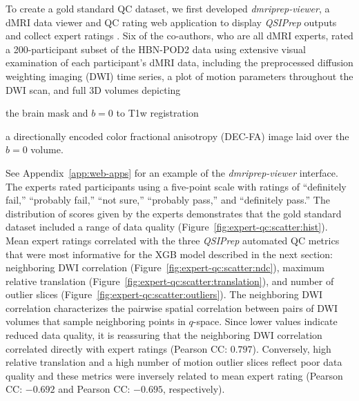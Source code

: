 \documentclass[9pt,lineno]{elife}
\begin{document}
To create a gold standard QC dataset, we first developed \emph{dmriprep-viewer},
a dMRI data viewer and QC rating web application to display \emph{QSIPrep}
outputs and collect expert ratings \citep{richie-halford2021-viewer}. Six of the
co-authors, who are all dMRI experts, rated a 200-participant subset of the
HBN-POD2 data using extensive visual examination of each participant's dMRI data,
including the preprocessed diffusion weighting imaging (DWI) time series, a plot of
motion parameters throughout the DWI scan, and full 3D volumes depicting
\begin{enumerate*}[%
    label=(\roman*),%
    before={{ }},%
    itemjoin={{, }},%
    itemjoin*={{ and }}]
    \item the brain mask and $b=0$ to T1w registration
    \item a directionally encoded color fractional anisotropy (DEC-FA) image laid over the $b=0$ volume.
\end{enumerate*}
See Appendix~\ref{app:web-apps} for an example of the \emph{dmriprep-viewer} interface. The experts rated participants using a five-point scale with ratings of ``definitely
fail,'' ``probably fail,'' ``not sure,'' ``probably pass,'' and ``definitely
pass.'' The distribution of scores given by the experts demonstrates that the
gold standard dataset included a range of data quality (Figure~\ref{fig:expert-qc:scatter:hist}). Mean expert ratings
correlated with the three \emph{QSIPrep} automated QC metrics that were most informative for the XGB model described in the next section:
neighboring DWI correlation \citep{yeh2019-kb} (Figure~\ref{fig:expert-qc:scatter:ndc}), maximum relative
translation (Figure~\ref{fig:expert-qc:scatter:translation}), and number of outlier slices (Figure~\ref{fig:expert-qc:scatter:outliers}). The neighboring DWI correlation characterizes
the pairwise spatial correlation between pairs of DWI volumes that sample
neighboring points in $q$-space. Since lower values indicate reduced data
quality, it is reassuring that the neighboring DWI correlation correlated directly with expert ratings
(Pearson CC: $0.797$). Conversely, high relative translation and a high number of
motion outlier slices reflect poor data quality and these metrics were inversely
related to mean expert rating (Pearson CC: $-0.692$ and Pearson CC: $-0.695$,
respectively).
\end{document}
